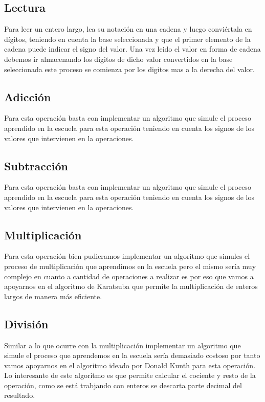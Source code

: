 \subsection{Lectura}

Para leer un entero largo, lea su notación en una cadena y luego conviértala en dígitos, teniendo en cuenta la base seleccionada y que el primer elemento de la cadena puede indicar el signo del valor. Una vez leido el valor en forma de cadena debemos ir almacenando los digitos de dicho valor convertidos en la base seleccionada este proceso se comienza por los digitos mas a la derecha del valor. 

\subsection{Adicción}

Para esta operación basta con implementar un algoritmo que simule el proceso aprendido en la escuela para esta operación teniendo en cuenta los signos de los valores que intervienen en la operaciones.


\subsection{Subtracción}

Para esta operación basta con implementar un algoritmo que simule el proceso aprendido en la escuela para esta operación teniendo en cuenta los signos de los valores que intervienen en la operaciones.

\subsection{Multiplicación}

Para esta operación bien pudieramos implementar un algoritmo que simules el proceso de multiplicación que aprendimos en la escuela pero el mismo sería muy complejo en cuanto a cantidad de operaciones a realizar es por eso que vamos a apoyarnos en el algoritmo de Karatsuba que permite la multiplicación de enteros largos de manera más eficiente.

\subsection{División}

Similar a lo que ocurre con la multiplicación implementar un algoritmo que simule el proceso que aprendemos en la escuela sería demasiado costoso por tanto vamos apoyarnos en el algoritmo ideado por Donald Kunth para esta operación. Lo interesante de este algoritmo es que permite calcular el cociente y resto de la operación, como se está trabjando con enteros se descarta parte decimal del resultado.